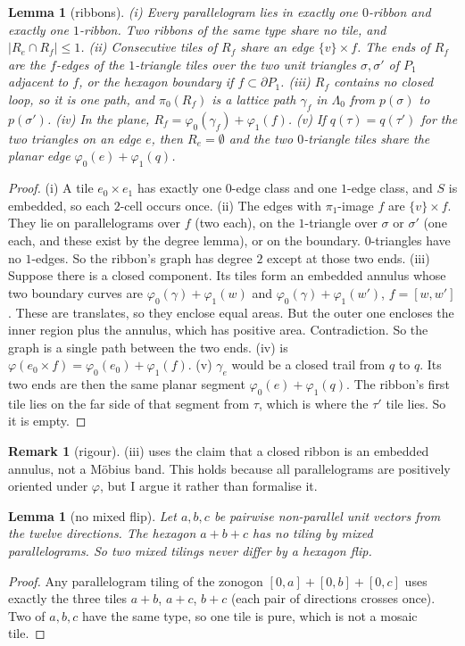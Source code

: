 \documentclass[11pt]{article}
\newtheorem{lemma}[theorem]{Lemma}
\theoremstyle{definition}
\newtheorem{remark}[theorem]{Remark}
\begin{document}
\begin{lemma}[ribbons]\label{lem:ribbon}
(i) Every parallelogram lies in exactly one $0$-ribbon and exactly one $1$-ribbon. Two ribbons of the same type share no tile, and $|R_e\cap R_f|\le1$.
(ii) Consecutive tiles of $R_f$ share an edge $\{v\}\times f$. The ends of $R_f$ are the $f$-edges of the $1$-triangle tiles over the two unit triangles
$\sigma,\sigma'$ of $P_1$ adjacent to $f$, or the hexagon boundary if $f\subset\partial P_1$. (iii) $R_f$ contains no closed loop, so it is one
path, and $\pi_0(R_f)$ is a lattice path $\gamma_f$ in $\Lambda_0$ from $p(\sigma)$ to $p(\sigma')$. (iv) In the plane, $R_f=\varphi_0(\gamma_f)+\varphi_1(f)$.
(v) If $q(\tau)=q(\tau')$ for the two triangles on an edge $e$, then $R_e=\emptyset$ and the two $0$-triangle tiles share the planar edge
$\varphi_0(e)+\varphi_1(q)$.
\end{lemma}
\begin{proof}
(i) A tile $e_0\times e_1$ has exactly one $0$-edge class and one $1$-edge class, and $S$ is embedded, so each $2$-cell occurs once.
(ii) The edges with $\pi_1$-image $f$ are $\{v\}\times f$. They lie on parallelograms over $f$ (two each), on the $1$-triangle over $\sigma$ or $\sigma'$
(one each, and these exist by the degree lemma), or on the boundary. $0$-triangles have no $1$-edges. So the ribbon's graph has degree $2$
except at those two ends. (iii) Suppose there is a closed component. Its tiles form an embedded annulus whose two boundary curves are
$\varphi_0(\gamma)+\varphi_1(w)$ and $\varphi_0(\gamma)+\varphi_1(w')$, $f=[w,w']$. These are translates, so they enclose equal areas. But the
outer one encloses the inner region plus the annulus, which has positive area. Contradiction. So the graph is a single path between the two
ends. (iv) is $\varphi(e_0\times f)=\varphi_0(e_0)+\varphi_1(f)$. (v) $\gamma_e$ would be a closed trail from $q$ to $q$. Its two ends are then the
same planar segment $\varphi_0(e)+\varphi_1(q)$. The ribbon's first tile lies on the far side of that segment from $\tau$, which is where the $\tau'$ tile
lies. So it is empty.
\end{proof}
\begin{remark}[rigour] (iii) uses the claim that a closed ribbon is an embedded annulus, not a M\"obius band. This holds because all
parallelograms are positively oriented under $\varphi$, but I argue it rather than formalise it.\end{remark}

\begin{lemma}[no mixed flip]\label{lem:noflip}
Let $a,b,c$ be pairwise non-parallel unit vectors from the twelve directions. The hexagon $a+b+c$ has no tiling by \emph{mixed}
parallelograms. So two mixed tilings never differ by a hexagon flip.
\end{lemma}
\begin{proof}
Any parallelogram tiling of the zonogon $[0,a]+[0,b]+[0,c]$ uses exactly the three tiles $a+b$, $a+c$, $b+c$ (each pair of directions crosses
once). Two of $a,b,c$ have the same type, so one tile is pure, which is not a mosaic tile.
\end{proof}
\end{document}
